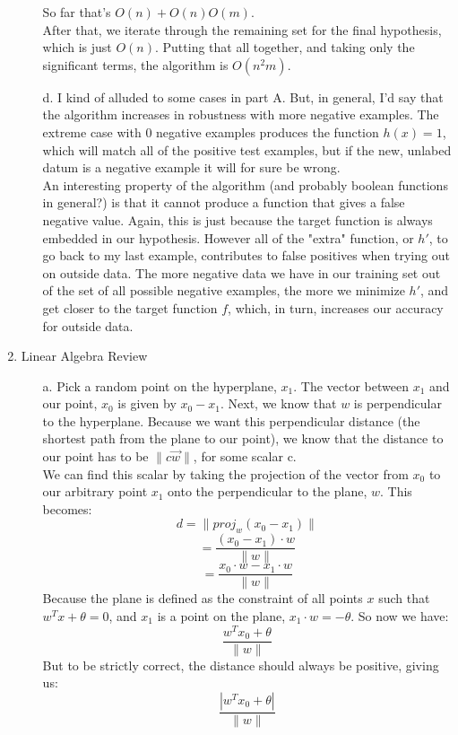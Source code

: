 \begin{enumerate}
\begin{enumerate}
			So far that's $O(n) + O(n)O(m)$.\\
			After that, we iterate through the remaining set for the final hypothesis, which is just $O(n)$.
			Putting that all together, and taking only the significant terms, the algorithm is $O(n^2m)$.
		\item[d.]
			I kind of alluded to some cases in part A. But, in general, I'd say that the algorithm increases in robustness with more negative 			 examples. The extreme case with 0 negative examples produces the function $h(x) = 1$, which will match all of the positive test
			examples, but if the new, unlabed datum is a negative example it will for sure be wrong.\\
			An interesting property of the algorithm (and probably boolean functions in general?) is that it cannot produce a function that gives a false negative value.
			Again, this is just because the target function is always embedded in our hypothesis. However all of the "extra" function, or $h'$, to go back to my last 
			example, contributes to false positives when trying out on outside data. The more negative data we have in our training set out of the set of all possible 
			negative examples, the more we minimize $h'$, and get closer to the target function $f$, which, in turn, increases our accuracy for outside data. 
	\end{enumerate}
\item Linear Algebra Review
	\begin{enumerate}
		\item[a.]
			Pick a random point on the hyperplane, $x_1$. The vector between $x_1$ and our point, $x_0$ is given by $x_0-x_1$. Next, we know that $w$ is perpendicular to the hyperplane. Because we want this perpendicular distance (the shortest path from the plane to our point), we know that the distance to our point has to be $\| c\vec{w} \|$, for some scalar c.\\
			We can find this scalar by taking the projection of the vector from $x_0$ to our arbitrary point $x_1$ onto the perpendicular to the plane, $w$. This becomes:\\
			$$d=\|proj_{w}(x_0-x_1)\|$$
			$$=\frac{(x_0-x_1)\cdot w}{\|w\|}$$
			$$=\frac{x_0\cdot w - x_1\cdot w}{\|w\|}$$
			Because the plane is defined as the constraint of all points $x$ such that $w^Tx+\theta=0$, and $x_1$ is a point on the plane, $x_1\cdot w = -\theta$. So now we have:
			$$\frac{w^T x_0 + \theta}{\|w\|}$$
			But to be strictly correct, the distance should always be positive, giving us:
			$$\frac{|w^T x_0 + \theta|}{\|w\|}$$

\end{enumerate}
\end{enumerate}
